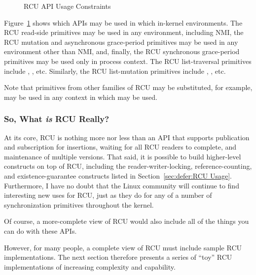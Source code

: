\begin{figure}[tb]
\centering
{}
\caption{RCU API Usage Constraints}
\label{fig:defer:RCU API Usage Constraints}
\end{figure}

Figure~\ref{fig:defer:RCU API Usage Constraints}
shows which APIs may be used in which in-kernel environments.
The RCU read-side primitives may be used in any environment, including NMI,
the RCU mutation and asynchronous grace-period primitives may be used in any
environment other than NMI, and, finally, the RCU synchronous grace-period
primitives may be used only in process context.
The RCU list-traversal primitives include ,
, etc.
Similarly, the RCU list-mutation primitives include
, , etc.

Note that primitives from other families of RCU may be substituted,
for example,  may be used in any context
in which  may be used.

\subsubsection{So, What \emph{is} RCU Really?}
\label{sec:defer:So, What is RCU Really?}

At its core, RCU is nothing more nor less than an API that supports
publication and subscription for insertions, waiting for all RCU readers
to complete, and maintenance of multiple versions.
That said, it is possible to build higher-level constructs
on top of RCU, including the reader-writer-locking, reference-counting,
and existence-guarantee constructs listed in
Section~\ref{sec:defer:RCU Usage}.
Furthermore, I have no doubt that the Linux community will continue to
find interesting new uses for RCU,
just as they do for any of a number of synchronization
primitives throughout the kernel.

Of course, a more-complete view of RCU would also include
all of the things you can do with these APIs.

However, for many people, a complete view of RCU must include sample
RCU implementations.
The next section therefore presents a series of ``toy'' RCU implementations
of increasing complexity and capability.
